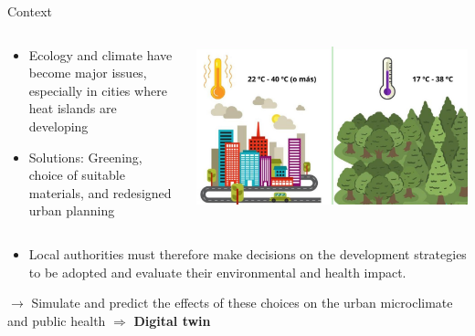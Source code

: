 \documentclass{beamer}
\begin{document}
\begin{frame}{Context}
    \small
    
    \begin{columns}[T]
    \begin{column}{0.6\textwidth}
    \begin{itemize}
        \setlength\itemindent{0.3cm}
        \item Ecology and climate have become major issues, especially in cities where heat islands are developing
        \item Solutions: Greening, choice of suitable materials, and redesigned urban planning
        \end{itemize}
    \end{column}

    \begin{column}{0.4\textwidth}
        \vspace{-0.3cm}
        \includegraphics[width=1\textwidth]{images/ilot_de_chaleur.jpg}
    \end{column}
    \end{columns}

    \vspace{0.2cm}

    \begin{itemize} %
        \item Local authorities must therefore make decisions on the development strategies to be adopted and evaluate their environmental and health impact.
    \end{itemize}
    $\rightarrow$ Simulate and predict the effects of these choices on the urban microclimate and public health $\Rightarrow $ \textbf{Digital twin}
\end{frame}
\end{document}
